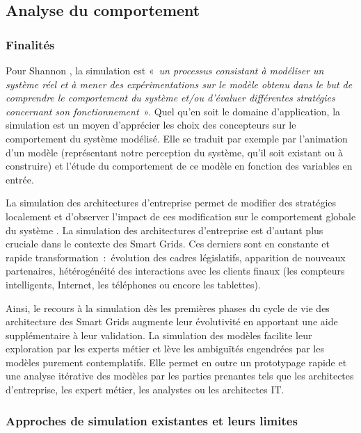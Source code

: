 	
\subsection{Analyse du comportement}

\subsubsection{Finalités}

Pour Shannon \cite{shannon1975systems}, la simulation est «~\emph{un processus
consistant à modéliser un système réel et à mener des expérimentations sur le
modèle obtenu dans le but de comprendre le comportement du système et/ou
d'évaluer différentes stratégies concernant son fonctionnement}~».  Quel qu'en
soit le domaine d'application, la simulation est un moyen d'apprécier les choix
des concepteurs sur le comportement du système modélisé. Elle se traduit par
exemple par l'animation d'un modèle (représentant notre perception du système,
qu'il soit existant ou à construire) et l'étude du comportement de ce modèle en
fonction des variables en entrée. 

La simulation des architectures d'entreprise permet de modifier des stratégies
localement et d'observer l'impact de ces modification sur le comportement
globale du système \cite{buckl2008towards}. La simulation des architectures
d'entreprise est d'autant plus cruciale dans le contexte des Smart Grids. Ces
derniers sont en constante et rapide transformation~:~évolution des cadres
législatifs, apparition de nouveaux partenaires, hétérogénéité des interactions
avec les clients finaux (les compteurs intelligents, Internet, les téléphones
ou encore les tablettes). 

Ainsi, le recours à la simulation dès les premières phases du cycle de vie des
architecture des Smart Grids augmente leur évolutivité en apportant une aide
supplémentaire à leur validation. La simulation des modèles facilite leur
exploration par les experts métier et lève les ambiguïtés engendrées par les
modèles purement contemplatifs. Elle permet en outre un prototypage rapide et
une analyse itérative des modèles par les parties prenantes tels que les
architectes d'entreprise, les expert métier, les analystes ou les architectes
IT. 

\subsubsection{Approches de simulation existantes et leurs limites}

